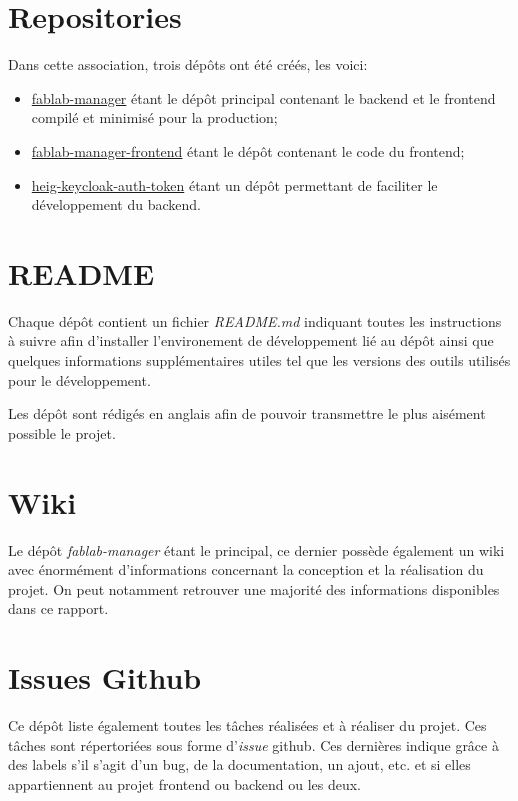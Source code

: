 \documentclass[
    iai, %
    il, %
]{heig-tb}
\begin{document}
\section{Repositories}
Dans cette association, trois dépôts ont été créés, les voici:
\begin{itemize}
    \item \href{https://github.com/heig-fablab/fablab-manager}{fablab-manager} étant le dépôt principal contenant le \Gls{backend} et le \Gls{frontend} compilé et minimisé pour la production;
    \item \href{https://github.com/heig-fablab/fablab-manager-frontend}{fablab-manager-frontend} étant le dépôt contenant le code du {frontend};
    \item \href{https://github.com/heig-fablab/heig-keycloak-auth-token}{heig-keycloak-auth-token} étant un dépôt permettant de faciliter le développement du \Gls{backend}.
\end{itemize}

\section{README}
Chaque dépôt contient un fichier \emph{README.md} indiquant toutes les instructions à suivre afin d'installer l'environement de développement lié au dépôt ainsi que quelques informations supplémentaires utiles tel que les versions des outils utilisés pour le développement.

Les dépôt sont rédigés en anglais afin de pouvoir transmettre le plus aisément possible le projet.

\section{Wiki}
Le dépôt \emph{fablab-manager} étant le principal, ce dernier possède également un wiki avec énormément d'informations concernant la conception et la réalisation du projet. On peut notamment retrouver une majorité des informations disponibles dans ce rapport.

\section{Issues Github}
Ce dépôt liste également toutes les tâches réalisées et à réaliser du projet. Ces tâches sont répertoriées sous forme d'\emph{issue} \Gls{github}. Ces dernières indique grâce à des labels s'il s'agit d'un bug, de la documentation, un ajout, etc. et si elles appartiennent au projet \Gls {frontend} ou \Gls{backend} ou les deux.
\end{document}
